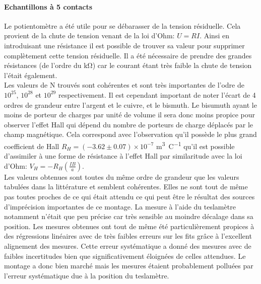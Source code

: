 \paragraph*{Echantillons à 5 contacts}
Le potientomètre a été utile pour se débarasser de la tension résiduelle. Cela provient de la chute de tension venant de la loi d'Ohm: \(U = R I\). Ainsi en introduisant une résistance il est possible de trouver sa valeur pour supprimer complètement cette tension résiduelle. Il a été nécessaire de prendre des grandes résistances (de l'ordre du \si{\kilo \ohm}) car le courant étant très faible la chute de tension l'était également.\\
Les valeurs de N trouvés sont cohérentes et sont très importantes de l'odre de \(10^{25}\), \(10^{28}\) et \(10^{29}\) respectivement. Il est cependant important de noter l'écart de 4 ordres de grandeur entre l'argent et le cuivre, et le bismuth. Le bisumuth ayant le moins de porteur de charges par unité de volume il sera donc moins propice pour observer l'effet Hall qui dépend du nombre de porteurs de charge déplacés par le champ magnétique. Cela correspond avec l'observation qu'il possède le plus grand coefficient de Hall \(R_H = (-3.62 \pm 0.07) \times 10^{-7}\) \si{\cubic \meter \per \coulomb} qu'il est possible d'assimiler à une forme de résistance à l'effet Hall par similaritude avec la loi d'Ohm: \(V_H = -R_H (\frac{IB}{a})\).\\
Les valeurs obtenues sont toutes du même ordre de grandeur que les valeurs tabulées dans la littérature \cite{notice} et semblent cohérentes. Elles ne sont tout de même pas toutes proches de ce qui était attendu ce qui peut être le résultat des sources d'imprécision importantes de ce montage. La mesure à l'aide du teslamètre notamment n'était que peu précise car très sensible au moindre décalage dans sa position. Les mesures obtenues ont tout de même été particulièrement propices à des régressions linéaires avec de très faibles erreurs sur les fits grâce à l'excellent alignement des mesures. Cette erreur systématique a donné des mesures avec de faibles incertitudes bien que significativement éloignées de celles attendues. Le montage a donc bien marché mais les mesures étaient probablement polluées par l'erreur systématique due à la position du teslamètre.